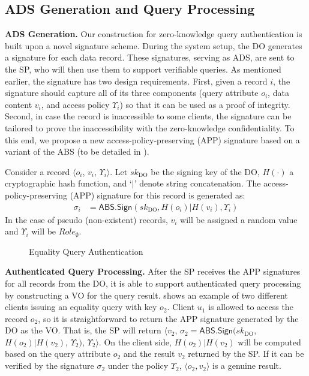 \subsection{ADS Generation and Query Processing}

\textbf{ADS Generation.} Our construction for zero-knowledge query authentication is built upon a novel signature scheme. During the system setup, the DO generates a signature for each data record. These signatures, serving as ADS, are sent to the SP, who will then use them to support verifiable queries. As mentioned earlier, the signature has two design requirements. First, given a record $i$, the signature should capture all of its three components (query attribute $o_i$, data content $v_i$, and access policy $\Upsilon_i$) so that it can be used as a proof of integrity. Second, in case the record is inaccessible to some clients, the signature can be tailored to prove the inaccessibility with the zero-knowledge confidentiality. To this end, we propose a new access-policy-preserving (APP) signature based on a variant of the ABS (to be detailed in ).

\begin{definition} Consider a record $\langle o_i$, $v_i$, $\Upsilon_i\rangle$. Let ${sk}_{\textrm{DO}}$ be the signing key of the DO, $H(\cdot)$ a cryptographic hash function, and `$|$' denote string concatenation. The access-policy-preserving (APP) signature for this record is generated as:
  \begin{align*}
    \sigma_i & = \textsf{ABS.Sign}({sk}_{\textrm{DO}}, H(o_i) | H(v_i) , \Upsilon_i)
  \end{align*}
  In the case of pseudo (non-existent) records, $v_i$ will be assigned  a random value and $\Upsilon_i$ will be ${Role}_{\emptyset}$.
\end{definition}

\begin{figure}[t]
  \centering
  \resizebox{\linewidth}{!}{}
  \caption{Equality Query Authentication}\label{fig:access-control:equality-query}
\end{figure}

\textbf{Authenticated Query Processing.}
After the SP receives the APP signatures for all records from the DO, it is able to support authenticated query processing by constructing a VO for the query result.
 shows an example of two different clients issuing an equality query with key $o_2$.
Client $u_1$ is allowed to access the record $o_2$, so it is straightforward to return the APP signature generated by the DO as the VO\@. That is, the SP will return $\langle v_2$, $\sigma_2 = \textsf{ABS.Sign}({sk}_\text{DO}$, $H(o_2) | H(v_2)$, $\Upsilon_2)$, $\Upsilon_2\rangle$. On the client side, $H(o_2) | H(v_2)$ will be computed based on the query attribute $o_2$ and the result $v_2$ returned by the SP\@. If it can be verified by the signature $\sigma_2$ under the policy $\Upsilon_2$, $\langle o_2, v_2\rangle$ is a genuine result. %

